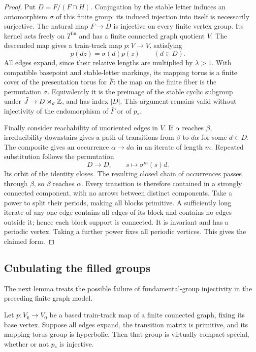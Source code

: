 \begin{proof}
Put $D=F/(F\cap H)$. Conjugation by the stable letter induces an
automorphism $\sigma$ of this finite group: its induced injection into
itself is necessarily surjective. The natural map $\bar F\to D$ is
injective on every finite vertex group. Its kernel acts freely on
$T^{\mathrm{fin}}$ and has a finite connected graph quotient $V$.
The descended map gives a train-track map $p:V\to V$, satisfying
\[
 p(dz)=\sigma(d)p(z)\qquad(d\in D).
\]
All edges expand, since their relative lengths are multiplied by
$\lambda>1$. With compatible basepoint and stable-letter markings, its
mapping torus is a finite cover of the presentation torus for $\bar F$:
the map on the finite fiber is the permutation $\sigma$.
Equivalently it is the preimage of the stable cyclic subgroup under
$\bar J\to D\rtimes_\sigma\mathbb Z$, and has index $|D|$.
This argument remains valid without injectivity of the endomorphism of
$\bar F$ or of $p_*$.

Finally consider reachability of unoriented edges in $V$. If $\alpha$
reaches $\beta$, irreducibility downstairs gives a path of transitions
from $\beta$ to $d\alpha$ for some $d\in D$. The composite gives an
occurrence $\alpha\to d\alpha$ in an iterate of length $m$.
Repeated substitution follows the permutation
\[
 D\longrightarrow D,\qquad s\longmapsto\sigma^m(s)d.
\]
Its orbit of the identity closes. The resulting closed chain of
occurrences passes through $\beta$, so $\beta$ reaches $\alpha$.
Every transition is therefore contained in a strongly connected
component, with no arrows between distinct components. Take a power to
split their periods, making all blocks primitive. A sufficiently long
iterate of any one edge contains all edges of its block and contains
no edges outside it; hence each block support is connected. It is
invariant and has a periodic vertex. Taking a further power fixes all
periodic vertices. This gives the claimed form.
\end{proof}

\subsection{Cubulating the filled groups}

The next lemma treats the possible failure of fundamental-group
injectivity in the preceding finite graph model.

\begin{lemma}\label{asc:injective-block}
Let $p:V_0\to V_0$ be a based train-track map of a finite connected graph,
fixing its base vertex. Suppose all edges expand, the transition matrix
is primitive, and its mapping-torus group is hyperbolic. Then that group
is virtually compact special, whether or not $p_*$ is injective.
\end{lemma}


